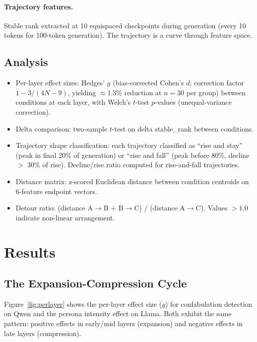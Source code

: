 \documentclass[11pt,a4paper]{article}
\begin{document}
\paragraph{Trajectory features.} Stable rank extracted at 10
equispaced checkpoints during generation (every 10 tokens for
100-token generation). The trajectory is a curve through feature
space.

\subsection{Analysis}

\begin{itemize}
\item Per-layer effect sizes: Hedges' $g$ (bias-corrected Cohen's $d$;
  correction factor $1 - 3/(4N-9)$, yielding $\approx$1.3\% reduction
  at $n = 30$ per group) between conditions at each layer, with
  Welch's $t$-test $p$-values (unequal-variance correction).
\item Delta comparison: two-sample $t$-test on delta stable\_rank
  between conditions.
\item Trajectory shape classification: each trajectory classified as
  ``rise and stay'' (peak in final 20\% of generation) or ``rise and
  fall'' (peak before 80\%, decline $>$ 30\% of rise). Decline/rise
  ratio computed for rise-and-fall trajectories.
\item Distance matrix: z-scored Euclidean distance between condition
  centroids on 6-feature endpoint vectors.
\item Detour ratio: (distance A$\to$B $+$ B$\to$C) / (distance
  A$\to$C). Values $> 1.0$ indicate non-linear arrangement.
\end{itemize}

\section{Results}
\label{sec:results}

\subsection{The Expansion-Compression Cycle}

Figure~\ref{fig:perlayer} shows the per-layer effect size ($g$) for
confabulation detection on Qwen and the persona intensity effect on
Llama. Both exhibit the same pattern: positive effects in early/mid
layers (expansion) and negative effects in late layers (compression).
\end{document}
